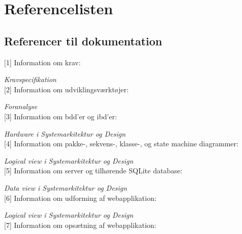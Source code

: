 \chapter{Referencelisten}


\section*{Referencer til dokumentation}

[1] Information om krav:
\vspace{-0.3cm}

\qquad \textit{Kravspecifikation} \\


[2] Information om udviklingsværktøjer:
\vspace{-0.3cm}

\qquad \textit{Foranalyse} \\


[3] Information om bdd'er og ibd'er:
\vspace{-0.3cm}

\qquad \textit{Hardware i Systemarkitektur og Design} \\


[4] Information om pakke-, sekvens-, klasse-, og state machine diagrammer:
\vspace{-0.3cm}

\qquad \textit{Logical view i Systemarkitektur og Design} \\


[5] Information om server og tilhørende SQLite database:
\vspace{-0.3cm}

\qquad \textit{Data view i Systemarkitektur og Design} \\


[6] Information om udforming af webapplikation:
\vspace{-0.3cm}

\qquad \textit{Logical view i Systemarkitektur og Design} \\


[7] Information om opsætning af webapplikation:
\vspace{-0.3cm}

